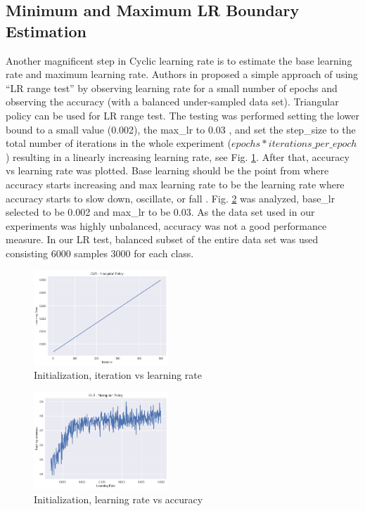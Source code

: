 \documentclass[journal, a4paper]{IEEEtran}
\begin{document}
\subsection{Minimum and Maximum LR Boundary Estimation}
Another magnificent step in Cyclic learning rate is to estimate the base learning rate and maximum learning rate. Authors in \cite{CLR} proposed a simple approach of using “LR range test” by observing learning rate for a small number of epochs and observing the accuracy (with a balanced under-sampled data set).
Triangular policy can be used for LR range test. The testing was performed setting the lower bound to a small value (0.002), the max\_lr to 0.03 , and set the step\_size to the total number of iterations in the whole experiment ($epochs * iterations\_per\_epoch$) resulting in a linearly increasing learning rate, see Fig. \ref{fig:init_iter_lr}. After that, accuracy vs learning rate was plotted. Base learning should be the point from where accuracy starts increasing and max learning rate to be the learning rate where accuracy starts to slow down, oscillate, or fall \cite{CLR}. Fig. \ref{fig:init_lr_acc} was analyzed, base\_lr selected to be 0.002 and max\_lr to be 0.03.
As the data set used in our experiments was highly unbalanced, accuracy was not a good performance measure. In our LR test, balanced subset of the entire data set was used consisting 6000 samples 3000 for each class.
    \begin{figure}[h!]
    \centering
    \includegraphics[width=0.45\textwidth]{images/init_iter_vs_lr.png} 
    \caption{Initialization, iteration vs learning rate}
    \label{fig:init_iter_lr}
    \end{figure}

    \begin{figure}[h!]
    \centering
    \includegraphics[width=0.45\textwidth]{images/init_lr_vs_accuracy.png}
    \caption{Initialization, learning rate vs accuracy}
    \label{fig:init_lr_acc}
    \end{figure}
\end{document}
